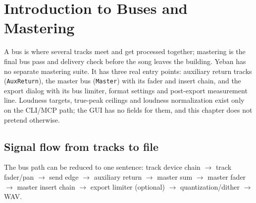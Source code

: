 \chapter{Introduction to Buses and Mastering}
\label{chap:bus-mastering}


A bus is where several tracks meet and get processed together; mastering is the final bus pass and delivery check before the song leaves the building. Yeban has no separate mastering suite. It has three real entry points: auxiliary return tracks (\texttt{AuxReturn}), the master bus (\texttt{Master}) with its fader and insert chain, and the export dialog with its bus limiter, format settings and post-export measurement line. Loudness targets, true-peak ceilings and loudness normalization exist only on the CLI/MCP path; the GUI has no fields for them, and this chapter does not pretend otherwise.

\section{Signal flow from tracks to file}

The bus path can be reduced to one sentence: track device chain $\rightarrow$ track fader/pan $\rightarrow$ send edge $\rightarrow$ auxiliary return $\rightarrow$ master sum $\rightarrow$ master fader $\rightarrow$ master insert chain $\rightarrow$ export limiter (optional) $\rightarrow$ quantization/dither $\rightarrow$ WAV.

\begin{center}
\end{center}

